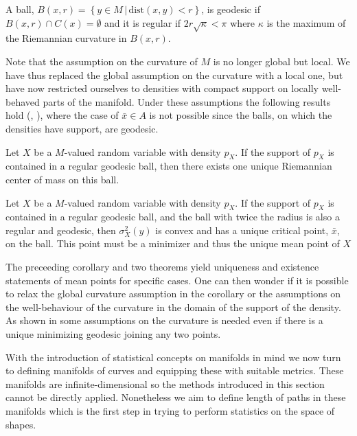 \begin{definition}
A ball, $B(x,r) = \left\{ y \in M \, | \, \text{dist}(x,y) < r  \right\}$, is geodesic if $B(x,r) \cap C(x) = \emptyset$ and it is regular if $2r \sqrt{\kappa} < \pi$ where $\kappa$ is the maximum of the Riemannian curvature in $B(x,r)$.
\end{definition}

Note that the assumption on the curvature of $M$ is no longer global but local. We have thus replaced the global assumption on the curvature with a local one, but have now restricted ourselves to densities with compact support on locally well-behaved parts of the manifold. Under these assumptions the following results hold (\cite{kendall1990probability}, \cite{karcher1977center}), where the case of $\bar{x} \in A$ is not possible since the balls, on which the densities have support, are geodesic. 

\begin{theorem}
Let $X$ be a $M$-valued random variable with density $p_X$. If the support of $p_X$ is contained in a regular geodesic ball, then there exists one unique Riemannian center of mass on this ball.
\end{theorem}

\begin{theorem}
Let $X$ be a $M$-valued random variable with density $p_X$. If the support of $p_X$ is contained in a regular geodesic ball, and the ball with twice the radius is also a regular and geodesic, then $\sigma^2_X(y)$ is convex and has a unique critical point, $\bar{x}$, on the ball. This point must be a minimizer and thus the unique mean point of $X$
\end{theorem}
The preceeding corollary and two theorems yield uniqueness and existence statements of mean points for specific cases. One can then wonder if it is possible to relax the global curvature assumption in the corollary or the assumptions on the well-behaviour of the curvature in the domain of the support of the density. As shown in \cite{kendall1992propeller} some assumptions on the curvature is needed even if there is a unique minimizing geodesic joining any two points.

With the introduction of statistical concepts on manifolds in mind we now turn to defining manifolds of curves and equipping these with suitable metrics. These manifolds are infinite-dimensional so the methods introduced in this section cannot be directly applied. Nonetheless we aim to define length of paths in these manifolds which is the first step in trying to perform statistics on the space of shapes. 


